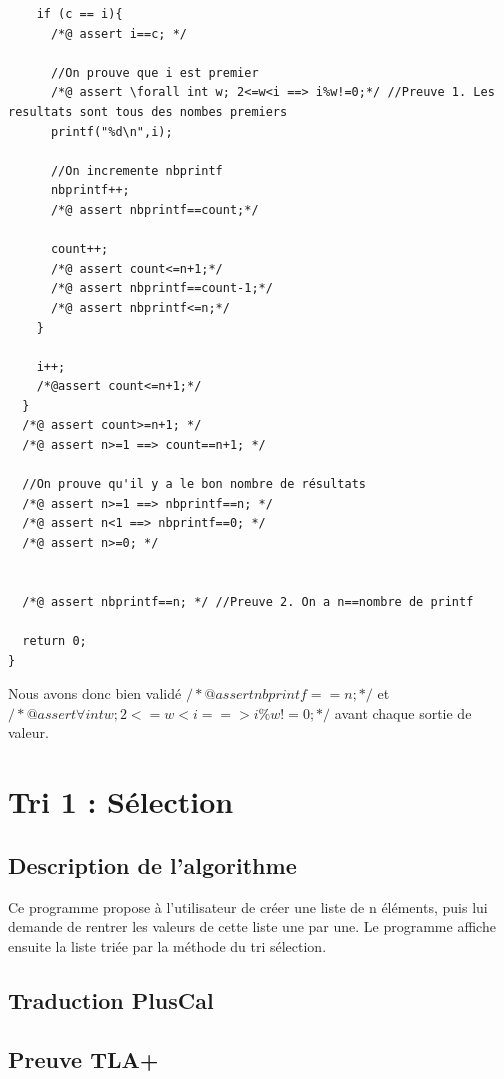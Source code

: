 \documentclass{scrreprt}
\begin{document}
\begin{lstlisting}
    if (c == i){
      /*@ assert i==c; */

      //On prouve que i est premier
      /*@ assert \forall int w; 2<=w<i ==> i%w!=0;*/ //Preuve 1. Les resultats sont tous des nombes premiers
      printf("%d\n",i);

	  //On incremente nbprintf
	  nbprintf++;
      /*@ assert nbprintf==count;*/

      count++;
      /*@ assert count<=n+1;*/
      /*@ assert nbprintf==count-1;*/
      /*@ assert nbprintf<=n;*/
    }

    i++;
    /*@assert count<=n+1;*/
  }
  /*@ assert count>=n+1; */
  /*@ assert n>=1 ==> count==n+1; */

  //On prouve qu'il y a le bon nombre de résultats
  /*@ assert n>=1 ==> nbprintf==n; */
  /*@ assert n<1 ==> nbprintf==0; */
  /*@ assert n>=0; */


  /*@ assert nbprintf==n; */ //Preuve 2. On a n==nombre de printf

  return 0;
}
\end{lstlisting}

Nous avons donc bien validé $/*@ assert nbprintf==n; */$ et $/*@ assert \forall int w; 2<=w<i ==> i\%w!=0;*/$ avant chaque sortie de valeur.

%
%
%

\chapter{Tri 1 : Sélection}

\section{Description de l'algorithme}
Ce programme propose à l'utilisateur de créer une liste de n éléments, puis lui demande de rentrer les valeurs de cette liste une par une. Le programme affiche ensuite la liste triée par la méthode du tri sélection.

\section{Traduction PlusCal}

\section{Preuve TLA+}
\end{document}
